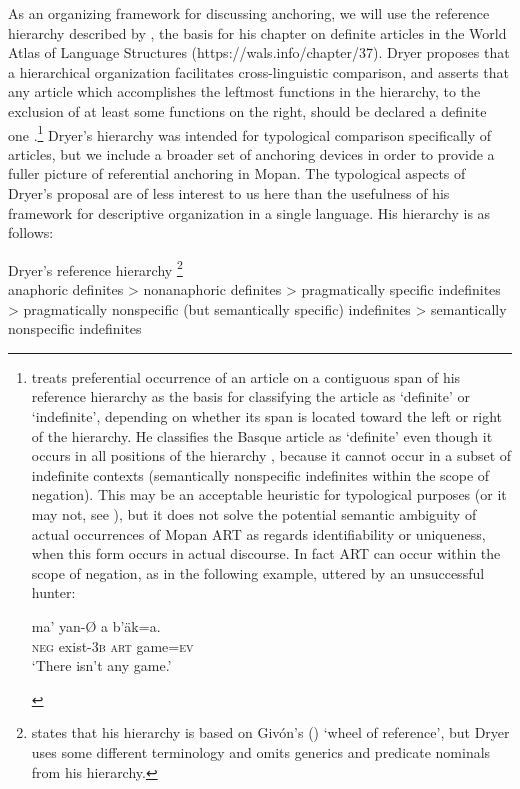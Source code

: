 \documentclass[output=paper]{langsci/langscibook}
\begin{document}
As an organizing framework for discussing anchoring, we will use the reference hierarchy described by \cite[][e235]{dryer:14}, the basis for his chapter on definite articles in the World Atlas of Language Structures (https://wals.info/chapter/37).  Dryer proposes that a hierarchical organization facilitates cross-linguistic comparison, and asserts that any article which accomplishes the leftmost functions in the hierarchy, to the exclusion of at least some functions on the right, should be declared a definite one \citep[][e241]{dryer:14}.\footnote{\cite[][e237-238]{dryer:14} treats preferential occurrence of an article on a contiguous span of his reference hierarchy as the basis for classifying the article as `definite' or `indefinite', depending on whether its span is located toward the left or right of the hierarchy.  He classifies the Basque article as `definite' even though it occurs in all positions of the hierarchy \citep[][e239]{dryer:14}, because it cannot occur in a subset of indefinite contexts (semantically nonspecific indefinites within the scope of negation).  This may be an acceptable heuristic for typological purposes (or it may not, see \citealt{contini:morava:danziger:fc}), but it does not solve the potential semantic ambiguity of actual occurrences of Mopan ART as regards identifiability or uniqueness, when this form occurs in actual discourse. In fact ART can occur within the scope of negation, as in the following example, uttered by an unsuccessful hunter:

\begin{exe}
\exi{}
\gll 	ma' 		yan-{\O}	 	a 	b'\"ak=a. \\
	{\textsc{neg}}	exist-{\textsc{3b}}	{\textsc{art}}	game{\textsc{=ev}} \\
\glt 	`There isn't any game.'
\end{exe}
} 
Dryer's hierarchy was intended for typological comparison specifically of articles, but we include a broader set of anchoring devices in order to provide a fuller picture of referential anchoring in Mopan. The typological aspects of Dryer's proposal are of less interest to us here than the usefulness of his framework for descriptive organization in a single language.  His hierarchy is as follows:

\begin{exe}
\exi{}
Dryer's reference hierarchy \citep[][e235]{dryer:14}\footnote{{\cite[][e235]{dryer:14} states that his hierarchy is based on Giv\'on's (\citeyear{givon:78}) `wheel of reference', but Dryer uses some different terminology and omits generics and predicate nominals from his hierarchy.}} \\
anaphoric definites > nonanaphoric definites > pragmatically specific indefinites > pragmatically nonspecific (but semantically specific) indefinites > semantically nonspecific indefinites
\end{exe}
\end{document}
